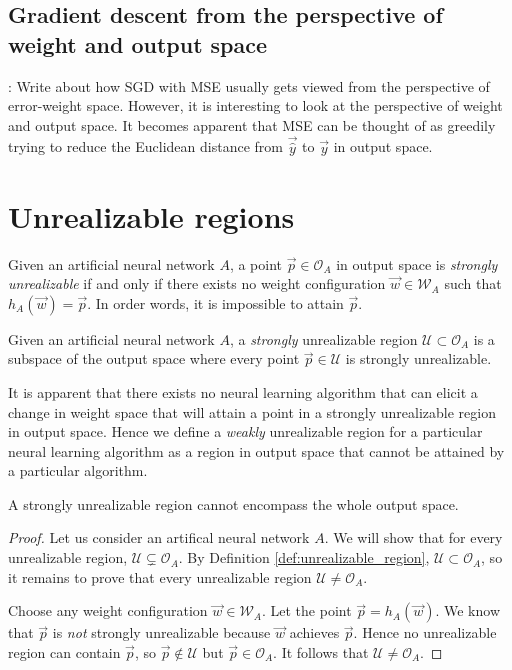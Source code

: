 \subsection{Gradient descent from the perspective of weight and output space}
\todo: Write about how SGD with MSE usually gets viewed from the perspective of error-weight space. However, it is interesting to look at the perspective of weight and output space. It becomes apparent that MSE can be thought of as greedily trying to reduce the Euclidean distance from $\vec{\hat{y}}$ to $\vec{y}$ in output space.

\section{Unrealizable regions}
\begin{definition}
    \label{def:unrealizable_point}
    Given an artificial neural network $A$, a point $\vec{p} \in \mathcal{O}_A$ in output space is \textit{strongly unrealizable} if and only if there exists no weight configuration $\vec{w} \in \mathcal{W}_A$ such that $h_A(\vec{w}) = \vec{p}$.
    In order words, it is impossible to attain $\vec{p}$.
\end{definition}
\begin{definition}
    \label{def:unrealizable_region}
    Given an artificial neural network $A$, a \textit{strongly} unrealizable region $\mathcal{U} \subset \mathcal{O}_A$ is a subspace of the output space where every point $\vec{p} \in \mathcal{U}$ is strongly unrealizable.
    
    It is apparent that there exists no neural learning algorithm that can elicit a change in weight space that will attain a point in a strongly unrealizable region in output space.
    Hence we define a \textit{weakly} unrealizable region for a particular neural learning algorithm as a region in output space that cannot be attained by a particular algorithm.
\end{definition}

\begin{lemma}
    A strongly unrealizable region cannot encompass the whole output space.
\end{lemma}
\begin{proof}
    Let us consider an artifical neural network $A$. 
    We will show that for every unrealizable region, $\mathcal{U} \subsetneq \mathcal{O}_A$.
    By Definition \ref{def:unrealizable_region}, $\mathcal{U} \subset \mathcal{O}_A$, so it remains to prove that every unrealizable region $\mathcal{U} \neq \mathcal{O}_A$.

    Choose any weight configuration $\vec{w} \in \mathcal{W}_A$. 
    Let the point $\vec{p}=h_A(\vec{w})$. 
    We know that $\vec{p}$ is \textit{not} strongly unrealizable because $\vec{w}$ achieves $\vec{p}$. 
    Hence no unrealizable region can contain $\vec{p}$, so $\vec{p} \notin \mathcal{U}$ but $\vec{p} \in \mathcal{O}_A$. 
    It follows that $\mathcal{U} \neq \mathcal{O}_A$.
\end{proof}

